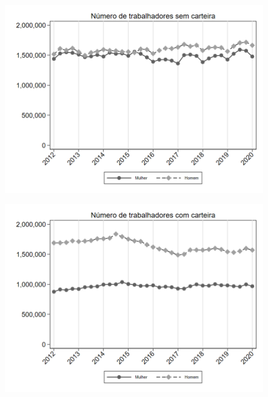 \begin{frame}[label=_composicao_demografica_genero_n_empregadoSC]{}
\textit{\hyperlink{_composicao_demografica_genero}{}}
\begin{figure}
  \centering
  \includegraphics[width=1.0\linewidth]{../../analysis/output/composicao_demografica/genero/_composicao_demografica_genero_n_empregadoSC.png}
  \caption{}
  \label{fig:_composicao_demografica_genero_n_empregadoSC}
\end{figure}
\end{frame}

\begin{frame}[label=_composicao_demografica_genero_n_empregadoCC]{}
\textit{\hyperlink{_composicao_demografica_genero}{}}
\begin{figure}
  \centering
  \includegraphics[width=1.0\linewidth]{../../analysis/output/composicao_demografica/genero/_composicao_demografica_genero_n_empregadoCC.png}
  \caption{}
  \label{fig:_composicao_demografica_genero_n_empregadoCC}
\end{figure}
\end{frame}

